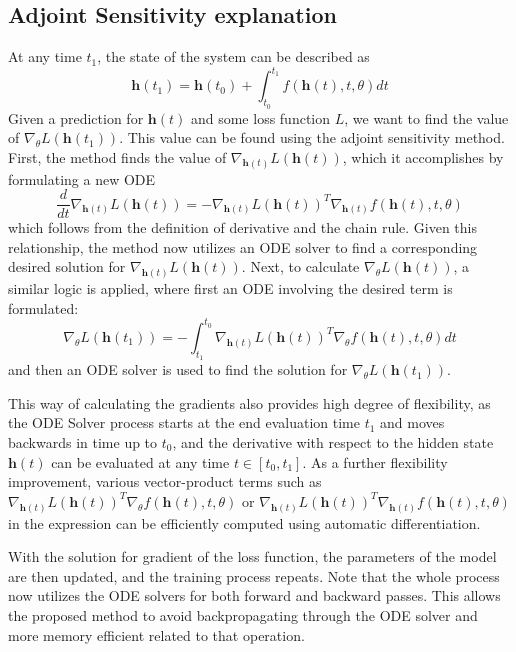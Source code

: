 \documentclass{article}
\begin{document}
\subsection{Adjoint Sensitivity explanation}
At any time $t_1$, the state of the system can be described as
\begin{equation}
    \mathbf{h}(t_1) = \mathbf{h}(t_0) + \int_{t_0}^{t_1}f(\mathbf{h}(t), t, \theta)dt  
\end{equation}
Given a prediction for $\mathbf{h}(t)$ and some loss function $L$, we want to find the value of \(\nabla_{\theta}L(\mathbf{h}(t_1)) \). This value can be found using the adjoint sensitivity method. First, the method finds the value of \(\nabla_{\mathbf{h}(t)} L(\mathbf{h}(t))\), which it accomplishes by formulating a new ODE
\begin{equation}
    \frac{d}{dt}\nabla_{\mathbf{h}(t)} L(\mathbf{h}(t)) = -\nabla_{\mathbf{h}(t)} L(\mathbf{h}(t)) ^T \nabla_{\mathbf{h}(t)} f(\mathbf{h}(t), t, \theta)
\end{equation}
which follows from the definition of derivative and the chain rule.
Given this relationship, the method now utilizes an ODE solver to find a corresponding desired solution for \(\nabla_{\mathbf{h}(t)} L(\mathbf{h}(t))\). Next, to calculate \(\nabla_{\theta} L(\mathbf{h}(t))\), a similar logic is applied, where first an ODE involving the desired term is formulated:
\begin{equation}
    \nabla_{\theta}L(\mathbf{h}(t_1)) = - \int_{t_1}^{t_0}\nabla_{\mathbf{h}(t)} L(\mathbf{h}(t)) ^T \nabla_{\theta} f(\mathbf{h}(t), t, \theta)dt
\end{equation}
and then an ODE solver is used to find the solution for \(\nabla_{\theta}L(\mathbf{h}(t_1))\). 

This way of calculating the gradients also provides high degree of flexibility, as the ODE Solver process starts at the end evaluation time $t_1$ and moves backwards in time up to $t_0$, and the derivative with respect to the hidden state $\mathbf{h}(t)$ can be evaluated at any time $t \in [t_0, t_1]$. As a further flexibility improvement, various vector-product terms such as $\nabla_{\mathbf{h}(t)} L(\mathbf{h}(t)) ^T \nabla_{\theta} f(\mathbf{h}(t), t, \theta)$ or $\nabla_{\mathbf{h}(t)} L(\mathbf{h}(t)) ^T \nabla_{\mathbf{h}(t)} f(\mathbf{h}(t), t, \theta)$ in the expression can be efficiently computed using automatic differentiation.

With the solution for gradient of the loss function, the parameters of the model are then updated, and the training process repeats. Note that the whole process now utilizes the ODE solvers for both forward and backward passes. This allows the proposed method to avoid backpropagating through the ODE solver and more memory efficient related to that operation.
\end{document}
